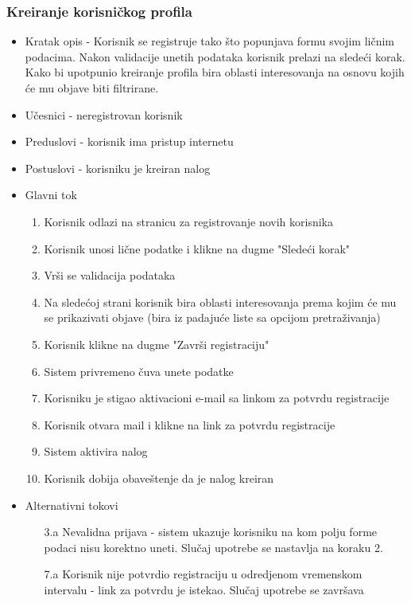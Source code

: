\subsubsection{Kreiranje korisničkog profila}
\begin{itemize}
	\item Kratak opis - Korisnik se registruje tako što popunjava formu svojim ličnim podacima. Nakon validacije unetih podataka korisnik prelazi na sledeći korak. Kako bi upotpunio kreiranje profila bira oblasti interesovanja na osnovu kojih će mu objave biti filtrirane.
	\item Učesnici - neregistrovan korisnik
	\item Preduslovi - korisnik ima pristup internetu
	\item Postuslovi - korisniku je kreiran nalog
	\item Glavni tok
	\begin{enumerate}
		\item Korisnik odlazi na stranicu za registrovanje novih korisnika
		\item Korisnik unosi lične podatke i klikne na dugme "Sledeći korak"
		\item Vrši se validacija podataka
		\item Na sledećoj strani korisnik bira oblasti interesovanja prema kojim će mu se prikazivati objave (bira iz padajuće liste sa opcijom pretraživanja)
		\item Korisnik klikne na dugme "Završi registraciju"
		\item Sistem privremeno čuva unete podatke
		\item Korisniku je stigao aktivacioni e-mail sa linkom za potvrdu registracije
		\item Korisnik otvara mail i klikne na link za potvrdu registracije
		\item Sistem aktivira nalog
		\item Korisnik dobija obaveštenje da je nalog kreiran
	\end{enumerate}
	\item Alternativni tokovi
	\begin{itemize}
		\item[3.a] Nevalidna prijava - sistem ukazuje korisniku na kom polju forme podaci nisu korektno uneti. Slučaj upotrebe se nastavlja na koraku 2.
		\item[7.a] Korisnik nije potvrdio registraciju u odredjenom vremenskom intervalu - link za potvrdu je istekao. Slučaj upotrebe se završava
	\end{itemize}
\end{itemize}

